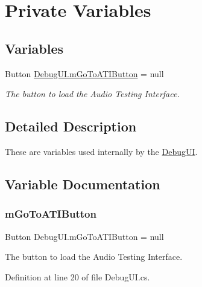 \hypertarget{group___deb_u_i_priv_var}{}\section{Private Variables}
\label{group___deb_u_i_priv_var}
\subsection*{Variables}
\begin{DoxyCompactItemize}
\item 
Button \hyperlink{group___deb_u_i_priv_var_gaf9bf8d3b03e88b32bf6a567cd95dfafb}{Debug\+U\+I.\+m\+Go\+To\+A\+T\+I\+Button} = null
\begin{DoxyCompactList}\small\item\em The button to load the Audio Testing Interface. \end{DoxyCompactList}\end{DoxyCompactItemize}


\subsection{Detailed Description}
These are variables used internally by the \hyperlink{class_debug_u_i}{Debug\+UI}. 

\subsection{Variable Documentation}
\mbox{\label{group___deb_u_i_priv_var_gaf9bf8d3b03e88b32bf6a567cd95dfafb}} 
\subsubsection{\texorpdfstring{m\+Go\+To\+A\+T\+I\+Button}{mGoToATIButton}}
{\footnotesize\ttfamily Button Debug\+U\+I.\+m\+Go\+To\+A\+T\+I\+Button = null\hspace{0.3cm}{\ttfamily [private]}}



The button to load the Audio Testing Interface. 



Definition at line 20 of file Debug\+U\+I.\+cs.

